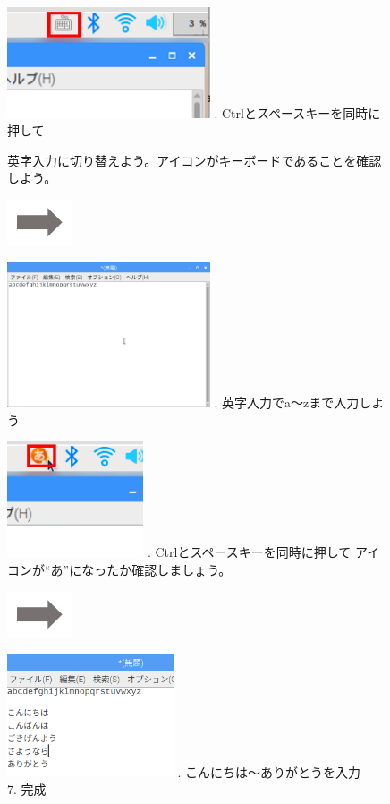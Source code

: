 \documentclass[a4paper,12pt]{jarticle}
\begin{document}
\begin{figure}[ht]
  \begin{minipage}{7.238cm}
    \includegraphics[width=6cm]{textbook-img059.png}
    . Ctrlとスペースキーを同時に押して

    英字入力に切り替えよう。アイコンがキーボードであることを確認しよう。
  \end{minipage}
  \includegraphics[width=1.919cm]{textbook-img053.png}
  \begin{minipage}{7.351cm}
    \includegraphics[width=6cm]{textbook-img061.png}
    . 英字入力でa〜zまで入力しよう
  \end{minipage}

  \begin{minipage}{6.73cm}
    \includegraphics[width=4.029cm]{textbook-img062.png}
    . Ctrlとスペースキーを同時に押して
    アイコンが“あ”になったか確認しましょう。
  \end{minipage}
  \includegraphics[width=1.919cm]{textbook-img053.png}
  \begin{minipage}{6.589cm}
    \includegraphics[width=4.914cm]{textbook-img060.png}
    . こんにちは〜ありがとうを入力\\
    7. 完成
  \end{minipage}




\end{figure}
\end{document}
